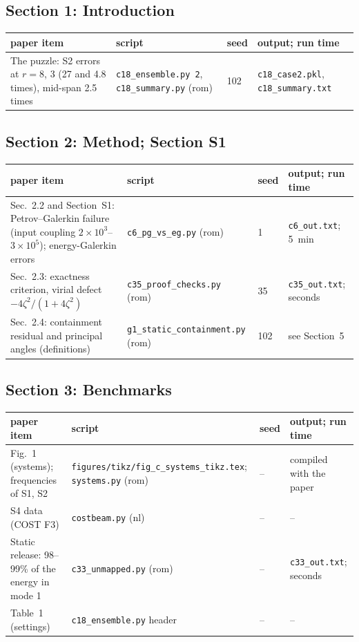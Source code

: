 \documentclass[10pt]{article}
\newcommand{\f}[1]{\texttt{#1}}
\begin{document}
\subsection*{Section 1: Introduction}
\begin{longtable}{L{0.31\textwidth}L{0.25\textwidth}L{0.08\textwidth}L{0.25\textwidth}}
\toprule
paper item & script & seed & output; run time\\ \midrule
The puzzle: S2 errors at $r=8$, 3 (27 and 4.8 times), mid-span 2.5 times & \f{c18\_\allowbreak{}ensemble.py 2}, \f{c18\_\allowbreak{}summary.py} (rom) & 102 & \f{c18\_\allowbreak{}case2.pkl}, \f{c18\_\allowbreak{}summary.txt}\\
\bottomrule
\end{longtable}

\subsection*{Section 2: Method; Section S1}
\begin{longtable}{L{0.31\textwidth}L{0.25\textwidth}L{0.08\textwidth}L{0.25\textwidth}}
\toprule
paper item & script & seed & output; run time\\ \midrule
Sec.~2.2 and Section~S1: Petrov--Galerkin failure (input coupling $2\times10^3$--$3\times10^5$); energy-Galerkin errors & \f{c6\_\allowbreak{}pg\_\allowbreak{}vs\_\allowbreak{}eg.py} (rom) & 1 & \f{c6\_\allowbreak{}out.txt}; 5~min\\
Sec.~2.3: exactness criterion, virial defect $-4\zeta^2/(1+4\zeta^2)$ & \f{c35\_\allowbreak{}proof\_\allowbreak{}checks.py} (rom) & 35 & \f{c35\_\allowbreak{}out.txt}; seconds\\
Sec.~2.4: containment residual and principal angles (definitions) & \f{g1\_\allowbreak{}static\_\allowbreak{}containment.py} (rom) & 102 & see Section~5\\
\bottomrule
\end{longtable}

\subsection*{Section 3: Benchmarks}
\begin{longtable}{L{0.31\textwidth}L{0.25\textwidth}L{0.08\textwidth}L{0.25\textwidth}}
\toprule
paper item & script & seed & output; run time\\ \midrule
Fig.~1 (systems); frequencies of S1, S2 & \f{figures/\allowbreak{}tikz/\allowbreak{}fig\_\allowbreak{}c\_\allowbreak{}systems\_\allowbreak{}tikz.tex}; \f{systems.py} (rom) & -- & compiled with the paper\\
S4 data (COST F3) & \f{costbeam.py} (nl) & -- & --\\
Static release: 98--99\% of the energy in mode 1 & \f{c33\_\allowbreak{}unmapped.py} (rom) & -- & \f{c33\_\allowbreak{}out.txt}; seconds\\
Table~1 (settings) & \f{c18\_\allowbreak{}ensemble.py} header & -- & --\\
\bottomrule
\end{longtable}
\end{document}
